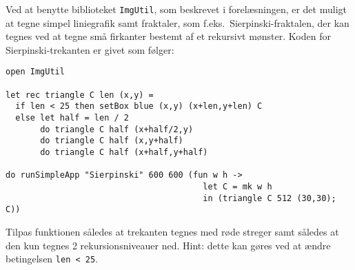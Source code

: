\label{sierpinski.ov} Ved at benytte biblioteket \texttt{ImgUtil}, som beskrevet i
  forelæsningen, er det muligt at tegne simpel liniegrafik samt
  fraktaler, som f.eks.\ Sierpinski-fraktalen, der kan tegnes ved at
  tegne små firkanter bestemt af et rekursivt mønster. Koden for
  Sierpinski-trekanten er givet som følger:
\begin{lstlisting}[numbers=none,frame=none,mathescape]
open ImgUtil

let rec triangle C len (x,y) =
  if len < 25 then setBox blue (x,y) (x+len,y+len) C
  else let half = len / 2
       do triangle C half (x+half/2,y)
       do triangle C half (x,y+half)
       do triangle C half (x+half,y+half)

do runSimpleApp "Sierpinski" 600 600 (fun w h ->
                                        let C = mk w h
                                        in (triangle C 512 (30,30); C))
\end{lstlisting}

Tilpas funktionen således at trekanten tegnes med røde streger samt
således at den kun tegnes 2 rekursionsniveauer ned. Hint: dette kan
gøres ved at ændre betingelsen \lstinline{len < 25}.
